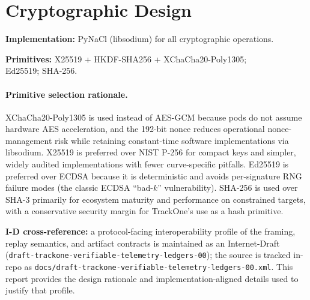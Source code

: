 \section{Cryptographic Design}
\label{sec:crypto-design}


\textbf{Implementation:} PyNaCl (libsodium) for all cryptographic operations.

\textbf{Primitives:} X25519 + \ac{HKDF}-\ac{SHA}256 + XChaCha20-Poly1305;\\
Ed25519; \ac{SHA}-256.

\paragraph{Primitive selection rationale.}
XChaCha20-Poly1305 is used instead of AES-GCM because pods do not assume hardware AES acceleration, and the 192-bit nonce reduces operational nonce-management risk while retaining constant-time software implementations via libsodium.
X25519 is preferred over \ac{NIST} P-256 for compact keys and simpler, widely audited implementations with fewer curve-specific pitfalls.
Ed25519 is preferred over ECDSA because it is deterministic and avoids per-signature RNG failure modes (the classic ECDSA ``bad-$k$'' vulnerability).
\ac{SHA}-256 is used over \ac{SHA}-3 primarily for ecosystem maturity and performance on constrained targets, with a conservative security margin for TrackOne’s use as a hash primitive.

\textbf{I-D cross-reference:} a protocol-facing interoperability profile of the framing, replay semantics, and artifact contracts is maintained as an Internet-Draft (\texttt{draft-trackone-verifiable-telemetry-ledgers-00}); the source is tracked in-repo as \texttt{docs/draft-trackone-verifiable-telemetry-ledgers-00.xml}.
This report provides the design rationale and implementation-aligned details used to justify that profile.

